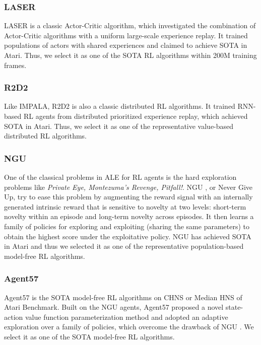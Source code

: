 \documentclass[nohyperref]{article}
\theoremstyle{plain}
\begin{document}
\subsubsection{LASER}
LASER \citep{laser} is a classic Actor-Critic algorithm, which investigated the combination of Actor-Critic algorithms with a uniform large-scale experience replay. It trained populations of actors with shared experiences and claimed to achieve SOTA in Atari. Thus, we select it as one of the SOTA RL algorithms within 200M training frames.

\subsubsection{R2D2}
\citep{r2d2}
Like IMPALA, R2D2 \citep{r2d2} is also a classic distributed RL algorithms. It trained  RNN-based RL agents from distributed prioritized experience replay, which achieved SOTA in Atari. Thus, we select it as one of the representative value-based distributed RL algorithms.


\subsubsection{NGU}
One of the classical problems in ALE for RL agents is the hard exploration problems \citep{goexplore,ale,agent57} like \textit{Private Eye, Montezuma’s Revenge, Pitfall!}. NGU \citep{ngu}, or Never Give Up, try to ease this problem by augmenting the reward signal with an internally generated intrinsic reward that is sensitive to novelty at two levels: short-term novelty within an episode and long-term novelty across episodes. It then learns a family
of policies for exploring and exploiting (sharing the same parameters) to obtain the highest score under the exploitative policy. NGU has achieved SOTA in Atari and thus  we selected it as one of the representative population-based model-free RL algorithms.

\subsubsection{Agent57}
Agent57 \citep{agent57} is the SOTA model-free RL algorithms on CHNS or Median HNS of Atari Benchmark. Built on the NGU agents, Agent57 proposed a novel state-action value function parameterization method and adopted an adaptive exploration over a family of policies, which overcome the drawback of NGU \citep{agent57}. We select it as one of the SOTA model-free RL algorithms.
\end{document}
